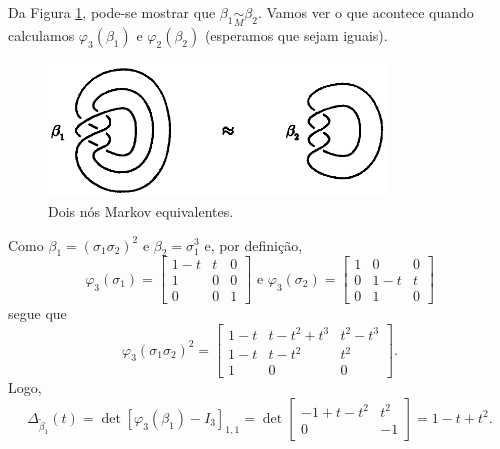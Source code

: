 	\par\vspace{0.3cm} Da Figura \ref{exemplo invariante de Alexander}, pode-se mostrar que
	$\beta_1\underset{M}{\sim}\beta_2$. Vamos ver o que acontece quando calculamos 
	$\varphi_3(\beta_1)$ e $\varphi_2(\beta_2)$ (esperamos que sejam iguais).
	\begin{figure}[H]
		\begin{center}
			\includegraphics[width=9cm]{Images/exemplo_invariante_alexander.png}
		\end{center}\caption{Dois nós Markov equivalentes.}\label{exemplo invariante de Alexander}
	\end{figure}
	Como $\beta_1 = (\sigma_1\sigma_2)^2$ e $\beta_2 = \sigma_1^3$ e, por definição,
	\begin{equation*}
    	\varphi_3(\sigma_1) = \begin{bmatrix}
    	1-t & t & 0 \\
    	1 & 0 & 0 \\
    	0 & 0 & 1 
    	\end{bmatrix}\text{ e } \varphi_3(\sigma_2) = \begin{bmatrix}
    	1 & 0 & 0 \\
    	0 & 1-t & t \\
    	0 & 1 & 0
    	\end{bmatrix}
	\end{equation*}
	segue que
	\begin{equation*}
    	\varphi_3(\sigma_1\sigma_2)^2 = \begin{bmatrix}
    	1-t & t-t^2+t^3 & t^2-t^3 \\
    	1-t & t-t^2 & t^2 \\
    	1 & 0 & 0
    	\end{bmatrix}.
	\end{equation*}
	Logo,
	\begin{equation*}
    	\Delta_{\widetilde{\beta}_1}(t) = \det[\varphi_3(\beta_1) - I_3]_{1,1} = \det\begin{bmatrix}
    	-1+t-t^2 & t^2 \\
    	0 & -1
    	\end{bmatrix} = 1-t+t^2.
	\end{equation*}
